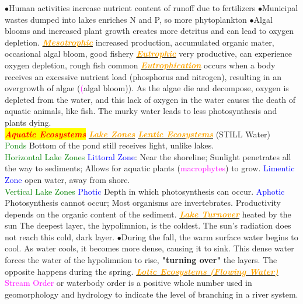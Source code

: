 \documentclass{article}
\newcommand{\ddd}{$\bullet$}
\newcommand{\red}[1]{\textcolor{red}{#1}}
\newcommand{\green}[1]{\textcolor{green}{#1}}
\newcommand{\blue}[1]{\textcolor{blue}{#1}}
\newcommand{\pink}[1]{\textcolor{magenta}{#1}}
\newcommand{\orange}[1]{\textcolor{orange}{#1}}
\newcommand{\mysection}[1]{\colorbox{yellow}{\textbf{\textit{\red{#1}}}}}
\newcommand{\mysubsection}[1]{\underline{\textbf{{\textit{\orange{#1}}}}}}
\newcommand{\mysubsub}[1]{{{\green{#1}}}}
\newcommand{\mysubsubsub}[1]{{{\blue{#1}}}}
\newcommand{\vocab}[1]{{\pink{#1}}}
\begin{document}
\begin{multicols*}{4}
            \ddd Human activities increase nutrient content of runoff due to fertilizers
            \ddd Municipal wastes dumped into lakes enriches N and P, so more phytoplankton
            \ddd Algal blooms and increased plant growth creates more detritus and can lead to oxygen depletion.
        \mysubsection{Mesotrophic} increased production, accumulated organic mater, occasional algal bloom, good fishery
        \mysubsection{Eutrophic} very productive, can experience oxygen depletion, rough fish common
        \mysubsection{Eutrophication} occurs when a body receives an excessive nutrient load (phosphorus and nitrogen), resulting in an overgrowth of algae (\pink(algal bloom)). As the algae die and decompose, oxygen is depleted from the water, and this lack of oxygen in the water causes the death of aquatic animals, like fish. The murky water leads to less photosynthesis and plants dying. 
    \\
    \mysection{Aquatic Ecosystems}
        \mysubsection{Lake Zones}
            \mysubsection{Lentic Ecosystems} (STILL Water) \\
            \mysubsub{Ponds} Bottom of the pond still receives light, unlike lakes.
            \\
            \mysubsub{Horizontal Lake Zones}
                \mysubsubsub{Littoral Zone}: Near the shoreline; Sunlight penetrates all the way to sediments; Allows for aquatic plants (\vocab{macrophytes}) to grow.
                \mysubsubsub{Limentic Zone} open water, away from shore.
            \\
            \mysubsub{Vertical Lake Zones}
                \mysubsubsub{Photic}
                    Depth in which photosynthesis can occur.
                \mysubsubsub{Aphotic}
                Photosynthesis cannot occur; Most organisms are invertebrates. Productivity depends on the organic content of the sediment.
          \mysubsection{Lake Turnover}
               heated by the sun The deepest layer, the hypolimnion, is the coldest. The sun's radiation does not reach this cold, dark layer. 
        	  \ddd During the fall, the warm surface water begins to cool. As water cools, it becomes more dense, causing it to sink. This dense water forces the water of the hypolimnion to rise, \textbf{"turning over"} the layers. The opposite happens during the spring.
        	  \mysubsection{Lotic Ecosystems (Flowing Water)}
        	  \vocab{Stream Order} or waterbody order is a positive whole number used in geomorphology and hydrology to indicate the level of branching in a river system. 

\end{multicols*}
\end{document}
